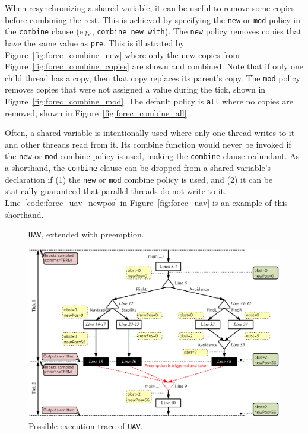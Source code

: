 When resynchronizing a shared variable, it can be useful to
remove some copies before combining the rest. This is
achieved by specifying the \verb$new$ or \verb$mod$ policy
in the \verb$combine$ clause (e.g., \verb$combine new with$). 
The \verb$new$ policy removes copies that have the
same value as \verb$pre$. This is illustrated by
Figure~\ref{fig:forec_combine_new} where only the new copies
from Figure~\ref{fig:forec_combine_copies} are shown and
combined. Note that if only one child thread has a copy,
then that copy replaces its parent's copy. The \verb$mod$
policy removes copies that were not assigned a value during
the tick, shown in Figure~\ref{fig:forec_combine_mod}. The
default policy is \verb$all$ where no copies are removed,
shown in Figure~\ref{fig:forec_combine_all}.

Often, a shared variable is intentionally used where only
one thread writes to it and other threads read from it. Its
combine function would never be invoked if the \verb$new$
or \verb$mod$ combine policy is used, making the
\verb$combine$ clause redundant. As a shorthand, the
\verb$combine$ clause can be dropped from a shared
variable's declaration if (1) the \verb$new$ or \verb$mod$
combine policy is used, and (2) it can be statically
guaranteed that parallel threads do not write to it.
Line~\ref{code:forec_uav_newpos} in
Figure~\ref{fig:forec_uav} is an example of this
shorthand.



\begin{figure}
	\centering

	\begin{minipage}[t]{0.67\columnwidth}
		
	\end{minipage}

	\caption{\texttt{UAV}, extended with preemption.}
	\label{fig:forec_uav_abort}
\end{figure}

\begin{figure}
	\centering

	\includegraphics[width=\columnwidth]{images/uav_timing2.pdf}

	\caption{Possible execution trace of \texttt{UAV}.}
	\label{fig:forec_uav_timing2}
\end{figure}

